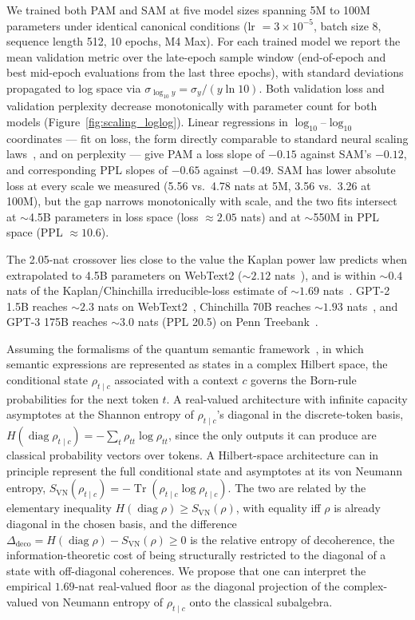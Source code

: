 \documentclass[aps,prl,twocolumn,superscriptaddress,amsmath,amssymb]{revtex4-2}
\begin{document}
We trained both PAM and SAM at five model sizes spanning 5M to 100M parameters under identical canonical conditions (lr $= 3 \times 10^{-5}$, batch size 8, sequence length 512, 10 epochs, M4 Max). For each trained model we report the mean validation metric over the late-epoch sample window (end-of-epoch and best mid-epoch evaluations from the last three epochs), with standard deviations propagated to log space via $\sigma_{\log_{10} y} = \sigma_y / (y \ln 10)$. Both validation loss and validation perplexity decrease monotonically with parameter count for both models (Figure~\ref{fig:scaling_loglog}). Linear regressions in $\log_{10}$--$\log_{10}$ coordinates --- fit on loss, the form directly comparable to standard neural scaling laws~\cite{kaplan2020scaling,hoffmann2022training}, and on perplexity --- give PAM a loss slope of $-0.15$ against SAM's $-0.12$, and corresponding PPL slopes of $-0.65$ against $-0.49$. SAM has lower absolute loss at every scale we measured (5.56 vs.\ 4.78 nats at 5M, 3.56 vs.\ 3.26 at 100M), but the gap narrows monotonically with scale, and the two fits intersect at $\sim$4.5B parameters in loss space (loss $\approx 2.05$ nats) and at $\sim$550M in PPL space (PPL $\approx 10.6$).

The 2.05-nat crossover lies close to the value the Kaplan power law predicts when extrapolated to 4.5B parameters on WebText2 ($\sim 2.12$ nats~\citep{kaplan2020scaling}), and is within $\sim 0.4$ nats of the Kaplan/Chinchilla irreducible-loss estimate of $\sim 1.69$ nats~\citep{hoffmann2022training}. GPT-2 1.5B reaches $\sim 2.3$ nats on WebText2~\citep{radford2019language}, Chinchilla 70B reaches $\sim 1.93$ nats~\citep{hoffmann2022training}, and GPT-3 175B reaches $\sim 3.0$ nats (PPL 20.5) on Penn Treebank~\citep{brown2020language}.

Assuming the formalisms of the quantum semantic framework~\citep{agostino2025quantum,agostino2026production}, in which semantic expressions are represented as states in a complex Hilbert space, the conditional state $\rho_{t \mid c}$ associated with a context $c$ governs the Born-rule probabilities for the next token $t$. A real-valued architecture with infinite capacity asymptotes at the Shannon entropy of $\rho_{t \mid c}$'s diagonal in the discrete-token basis, $H(\operatorname{diag} \rho_{t \mid c}) = -\sum_t \rho_{tt} \log \rho_{tt}$, since the only outputs it can produce are classical probability vectors over tokens. A Hilbert-space architecture can in principle represent the full conditional state and asymptotes at its von Neumann entropy, $S_{\text{VN}}(\rho_{t \mid c}) = -\operatorname{Tr}(\rho_{t \mid c} \log \rho_{t \mid c})$. The two are related by the elementary inequality $H(\operatorname{diag} \rho) \ge S_{\text{VN}}(\rho)$, with equality iff $\rho$ is already diagonal in the chosen basis, and the difference $\Delta_{\text{deco}} = H(\operatorname{diag} \rho) - S_{\text{VN}}(\rho) \ge 0$ is the relative entropy of decoherence, the information-theoretic cost of being structurally restricted to the diagonal of a state with off-diagonal coherences. We propose that one can interpret the empirical $1.69$-nat real-valued floor as the diagonal projection of the complex-valued von Neumann entropy of $\rho_{t \mid c}$ onto the classical subalgebra.
\end{document}
